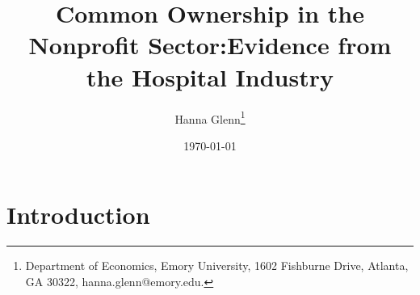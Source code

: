 \documentclass[12pt]{article}
\begin{document}
	
	
	
	
	\linespread{1.2}\title{\vspace{-0.5in} Common Ownership in the Nonprofit Sector:\newline Evidence from the Hospital Industry} 
	
	\date{\today}
	
	\author{\vspace{10mm}Hanna Glenn\footnote{Department of Economics, Emory University, 1602 Fishburne Drive, Atlanta, GA 30322, hanna.glenn@emory.edu.} }
	
	\maketitle
	
	\vspace{-0.2in}
	
	\singlespacing\maketitle


 \vspace{3mm}
	
    \begin{abstract}
		{\small

		} 
	\end{abstract}
	
	
	
	
	

	
	\onehalfspacing
	
	\newpage

    \section{Introduction}
\end{document}

